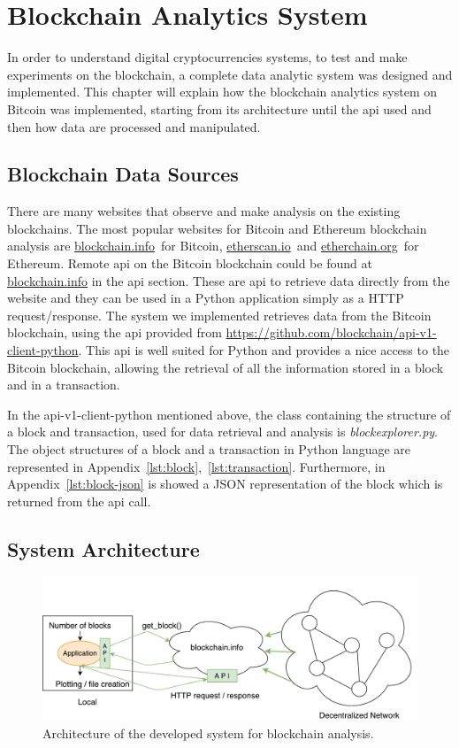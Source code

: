 \documentclass[USenglish]{uit-thesis}
\begin{document}
\chapter{Blockchain Analytics System}
\label{chap:expsetup}
In order to understand digital cryptocurrencies systems,
to test and make experiments on the blockchain, a complete data analytic
system was designed and implemented. This chapter will explain how the
blockchain analytics system on Bitcoin was implemented,
starting from its architecture until the \gls{api}
used and then how data are processed and manipulated.

\section{Blockchain Data Sources}
\label{sec:apis}
There are many websites that observe and make analysis on the existing blockchains. The most
popular websites for Bitcoin and Ethereum blockchain analysis are \url{blockchain.info}\,\cite{bitcoin_blockchain}
for Bitcoin, \url{etherscan.io}\,\cite{ethereum_bc_analysis} and \url{etherchain.org}\,\cite{ethereum_blockchain}
for Ethereum.
Remote \gls{api} on the Bitcoin blockchain could be found at \url{blockchain.info}
in the \gls{api} section. These are \gls{api} to retrieve data directly from
the website and they can be used in a Python application simply as a HTTP request/response.
The system we implemented retrieves data from the Bitcoin blockchain, using the \gls{api}
provided from \url{https://github.com/blockchain/api-v1-client-python}. This \gls{api} is well suited
for Python and provides a nice access to the Bitcoin blockchain, allowing the retrieval
of all the information stored in a block and in a transaction.

In the api-v1-client-python mentioned above, the class containing the
structure of a block and transaction, used for data retrieval and
analysis is \emph{blockexplorer.py}. The object structures of a block and a
transaction in Python language are represented in Appendix~\ref{lst:block},~\ref{lst:transaction}.
Furthermore, in Appendix~\ref{lst:block-json} is showed a JSON representation of the block which is
returned from the \gls{api} call.

\section{System Architecture}
\label{sec:implementation}

\begin{figure}[h]
	\centering
	\includegraphics[width=1\textwidth]{img/architecture}
	\caption{Architecture of the developed system for blockchain analysis.}
	\label{fig:architecture}
\end{figure}
\end{document}

